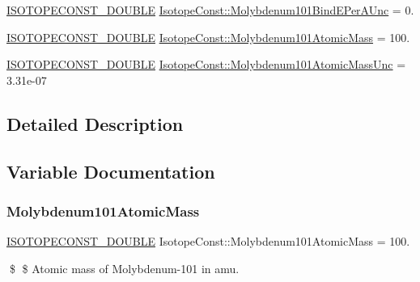 \begin{DoxyCompactItemize}
\item 
\mbox{\hyperlink{group___isotope_const-_macros_ga8f45a7272ce02c0b4c65c44636ed719a}{I\+S\+O\+T\+O\+P\+E\+C\+O\+N\+S\+T\+\_\+\+D\+O\+U\+B\+LE}} \mbox{\hyperlink{group___isotope_const-_molybdenum-_mo101_gaf89cba136c8de94e86fffea8ccf1373d}{Isotope\+Const\+::\+Molybdenum101\+Bind\+E\+Per\+A\+Unc}} = 0.
\item 
\mbox{\hyperlink{group___isotope_const-_macros_ga8f45a7272ce02c0b4c65c44636ed719a}{I\+S\+O\+T\+O\+P\+E\+C\+O\+N\+S\+T\+\_\+\+D\+O\+U\+B\+LE}} \mbox{\hyperlink{group___isotope_const-_molybdenum-_mo101_ga1fa91b48c362971c09268ca6f1d9e475}{Isotope\+Const\+::\+Molybdenum101\+Atomic\+Mass}} = 100.
\item 
\mbox{\hyperlink{group___isotope_const-_macros_ga8f45a7272ce02c0b4c65c44636ed719a}{I\+S\+O\+T\+O\+P\+E\+C\+O\+N\+S\+T\+\_\+\+D\+O\+U\+B\+LE}} \mbox{\hyperlink{group___isotope_const-_molybdenum-_mo101_gac4c21df2cdc930140fe83ce0ae42ea20}{Isotope\+Const\+::\+Molybdenum101\+Atomic\+Mass\+Unc}} = 3.\+31e-\/07
\end{DoxyCompactItemize}


\subsection{Detailed Description}


\subsection{Variable Documentation}
\mbox{\label{group___isotope_const-_molybdenum-_mo101_ga1fa91b48c362971c09268ca6f1d9e475}} 
\subsubsection{\texorpdfstring{Molybdenum101\+Atomic\+Mass}{Molybdenum101AtomicMass}}
{\footnotesize\ttfamily \mbox{\hyperlink{group___isotope_const-_macros_ga8f45a7272ce02c0b4c65c44636ed719a}{I\+S\+O\+T\+O\+P\+E\+C\+O\+N\+S\+T\+\_\+\+D\+O\+U\+B\+LE}} Isotope\+Const\+::\+Molybdenum101\+Atomic\+Mass = 100.}

\$ \$ Atomic mass of Molybdenum-\/101 in amu. \mbox{\label{group___isotope_const-_molybdenum-_mo101_gac4c21df2cdc930140fe83ce0ae42ea20}} 
